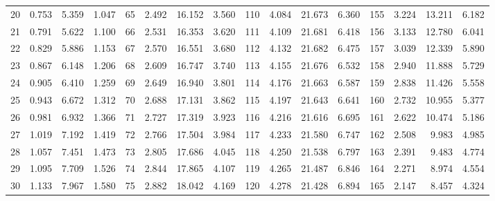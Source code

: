 \begin{table}
{\begin{tabular}{rrrr|rrrr|rrrr|rrrr}
 20 & \tiny{  0.753} &   5.359 & \tiny{  1.047} &  65 & \tiny{  2.492} &  16.152 & \tiny{  3.560} & 110 & \tiny{  4.084} &  21.673 & \tiny{  6.360} & 155 & \tiny{  3.224} &  13.211 & \tiny{  6.182}\\
 21 & \tiny{  0.791} &   5.622 & \tiny{  1.100} &  66 & \tiny{  2.531} &  16.353 & \tiny{  3.620} & 111 & \tiny{  4.109} &  21.681 & \tiny{  6.418} & 156 & \tiny{  3.133} &  12.780 & \tiny{  6.041}\\
 22 & \tiny{  0.829} &   5.886 & \tiny{  1.153} &  67 & \tiny{  2.570} &  16.551 & \tiny{  3.680} & 112 & \tiny{  4.132} &  21.682 & \tiny{  6.475} & 157 & \tiny{  3.039} &  12.339 & \tiny{  5.890}\\
 23 & \tiny{  0.867} &   6.148 & \tiny{  1.206} &  68 & \tiny{  2.609} &  16.747 & \tiny{  3.740} & 113 & \tiny{  4.155} &  21.676 & \tiny{  6.532} & 158 & \tiny{  2.940} &  11.888 & \tiny{  5.729}\\
 24 & \tiny{  0.905} &   6.410 & \tiny{  1.259} &  69 & \tiny{  2.649} &  16.940 & \tiny{  3.801} & 114 & \tiny{  4.176} &  21.663 & \tiny{  6.587} & 159 & \tiny{  2.838} &  11.426 & \tiny{  5.558}\\
 25 & \tiny{  0.943} &   6.672 & \tiny{  1.312} &  70 & \tiny{  2.688} &  17.131 & \tiny{  3.862} & 115 & \tiny{  4.197} &  21.643 & \tiny{  6.641} & 160 & \tiny{  2.732} &  10.955 & \tiny{  5.377}\\
 26 & \tiny{  0.981} &   6.932 & \tiny{  1.366} &  71 & \tiny{  2.727} &  17.319 & \tiny{  3.923} & 116 & \tiny{  4.216} &  21.616 & \tiny{  6.695} & 161 & \tiny{  2.622} &  10.474 & \tiny{  5.186}\\
 27 & \tiny{  1.019} &   7.192 & \tiny{  1.419} &  72 & \tiny{  2.766} &  17.504 & \tiny{  3.984} & 117 & \tiny{  4.233} &  21.580 & \tiny{  6.747} & 162 & \tiny{  2.508} &   9.983 & \tiny{  4.985}\\
 28 & \tiny{  1.057} &   7.451 & \tiny{  1.473} &  73 & \tiny{  2.805} &  17.686 & \tiny{  4.045} & 118 & \tiny{  4.250} &  21.538 & \tiny{  6.797} & 163 & \tiny{  2.391} &   9.483 & \tiny{  4.774}\\
 29 & \tiny{  1.095} &   7.709 & \tiny{  1.526} &  74 & \tiny{  2.844} &  17.865 & \tiny{  4.107} & 119 & \tiny{  4.265} &  21.487 & \tiny{  6.846} & 164 & \tiny{  2.271} &   8.974 & \tiny{  4.554}\\
 30 & \tiny{  1.133} &   7.967 & \tiny{  1.580} &  75 & \tiny{  2.882} &  18.042 & \tiny{  4.169} & 120 & \tiny{  4.278} &  21.428 & \tiny{  6.894} & 165 & \tiny{  2.147} &   8.457 & \tiny{  4.324}\\

\end{tabular}}
\end{table}
